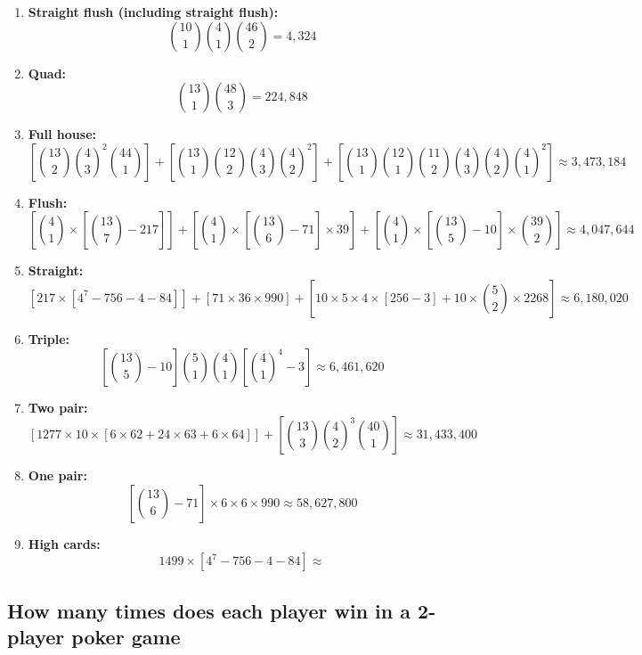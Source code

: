 \documentclass{article}
\begin{document}
\begin{enumerate}
    \item \textbf{Straight flush (including straight flush):}
    \[
        \binom{10}{1} \binom{4}{1} \binom{46}{2} 
        = 4,324
    \]
    \item \textbf{Quad:} 
    \[
        \binom{13}{1} \binom{48}{3} 
        = 224,848
    \]
    \item \textbf{Full house:}
    \[
        \left[ \binom{13}{2} \binom{4}{3}^2 \binom{44}{1} \right]
        + \left[ \binom{13}{1} \binom{12}{2} \binom{4}{3} \binom{4}{2}^2 \right]
        + \left[ \binom{13}{1} \binom{12}{1} \binom{11}{2} \binom{4}{3} \binom{4}{2} \binom{4}{1}^2 \right]
        \approx 3,473,184
    \]
    \item \textbf{Flush:}
    \[
        \left[ \binom{4}{1} \times \left[ \binom{13}{7} - 217 \right] \right]
        + \left[ \binom{4}{1} \times \left[ \binom{13}{6} - 71 \right] \times 39 \right]
        + \left[ \binom{4}{1} \times \left[ \binom{13}{5} - 10 \right] \times \binom{39}{2} \right]
        \approx 4,047,644
    \]
    \item \textbf{Straight:}
    \[
        [217 \times [4^7 - 756 - 4 - 84]] 
        + [71 \times 36 \times 990] 
        + \left[ 10 \times 5 \times 4 \times [256 - 3] + 10 \times \binom{5}{2} \times 2268 \right]
        \approx 6,180,020
    \]
    \item \textbf{Triple:}
    \[
        \left[ \binom{13}{5} - 10 \right] \binom{5}{1} \binom{4}{1} \left[ \binom{4}{1}^4 - 3 \right]
        \approx 6,461,620
    \]
    \item \textbf{Two pair:}
    \[
        [1277 \times 10 \times [6 \times 62 + 24 \times 63 + 6 \times 64]]
        + \left[ \binom{13}{3} \binom{4}{2}^3 \binom{40}{1} \right]
        \approx 31,433,400
    \]
    \item \textbf{One pair:}
    \[
        \left[ \binom{13}{6} - 71 \right] \times 6 \times 6 \times 990
        \approx 58,627,800
    \]
    \item \textbf{High cards:}
    \[
        1499 \times [ 4^7 - 756 - 4 - 84 ]
        \approx 
    \]

\end{enumerate}



\subsection*{How many times does each player win in a 2-player poker game}
\end{document}
